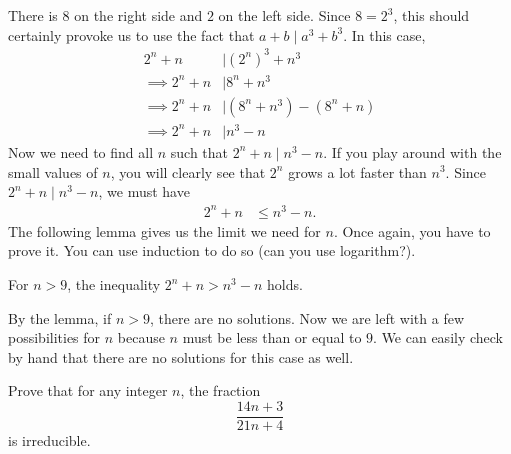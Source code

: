 \documentclass{subfile}
\begin{document}
		\begin{solution}
			There is $8$ on the right side and $2$ on the left side. Since $8=2^3$, this should certainly provoke us to use the fact that $a+b\mid a^3+b^3$. In this case,
				\begin{align*}
					2^n+n   & \mid (2^n)^3+n^3 \\
					\implies  2^n+n & \mid 8^n+n^3\\
					\implies 2^n+n	& \mid (8^n+n^3)-(8^n+n)\\
					\implies 2^n+n & \mid n^3-n
				\end{align*}
			Now we need to find all $n$ such that $2^n+n\mid n^3-n$. If you play around with the small values of $n$, you will clearly see that $2^n$ grows a lot faster than $n^3$. Since $2^n+n\mid n^3-n$, we must have
				\begin{align*}
					2^n+n & \leq n^3-n.
				\end{align*}
			The following lemma gives us the limit we need for $n$. Once again, you have to prove it. You can use induction to do so (can you use logarithm?).
				\begin{lemma}
					For $n>9$, the inequality $2^n+n>n^3-n$ holds.
				\end{lemma}
			By the lemma, if $n>9$, there are no solutions. Now we are left with a few possibilities for $n$ because $n$ must be less than or equal to $9$. We can easily check by hand that there are no solutions for this case as well.
		\end{solution}

		\begin{problem}
			Prove that for any integer $n$, the fraction $$\dfrac{14n+3}{21n+4}$$ is irreducible.
		\end{problem}
\end{document}
